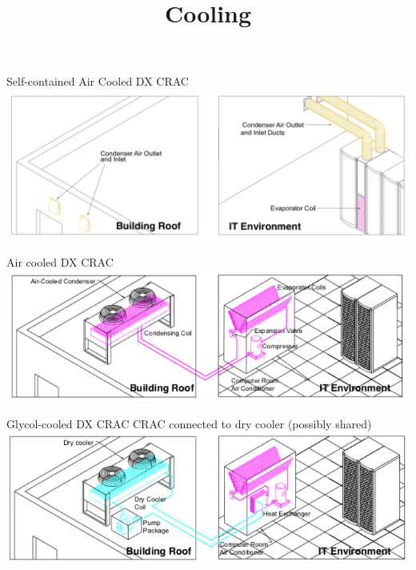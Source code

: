 \documentclass{pgslides}
\title{Cooling}
\begin{document}
\maketitle








\begin{frame}{Self-contained Air Cooled DX CRAC}
  \includegraphics[width=1.0\linewidth]{crac_self_contained_schematic}
\end{frame}

\begin{frame}{Air cooled DX CRAC}
  \includegraphics[width=1.0\linewidth]{crac_dx_air_schematic}
\end{frame}

\begin{frame}{Glycol-cooled DX CRAC}
  CRAC connected to dry cooler (possibly shared)\\
  \includegraphics[width=1.0\linewidth]{crac_dx_glycol_schematic}
\end{frame}
\end{document}
